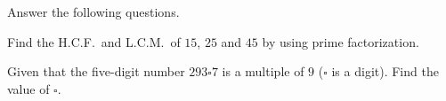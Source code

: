  Answer the following questions.

\begin{subparts}
  \item Find the H.C.F.\ and L.C.M.\ of $15$, $25$ and $45$ by using prime factorization.
  \item Given that the five-digit number $293\square 7$ is a multiple of $9$ ($\square$ is a digit). Find the value of $\square$.
\end{subparts}

